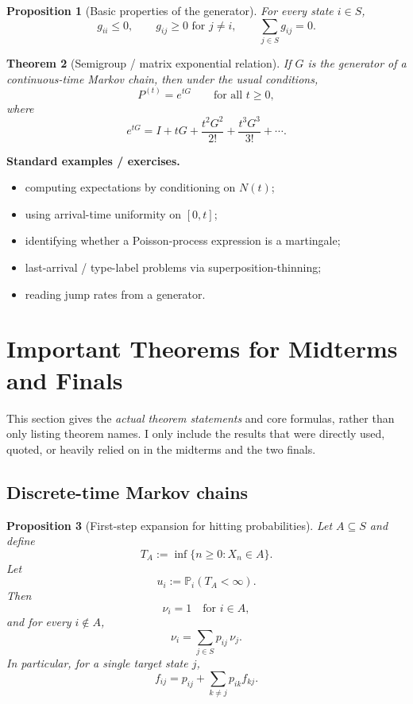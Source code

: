 \documentclass[11pt]{article}
\newtheorem{theorem}{Theorem}[section]
\newtheorem{proposition}[theorem]{Proposition}
\theoremstyle{definition}
\begin{document}
\begin{proposition}[Basic properties of the generator]
For every state $i\in S$,
\[
g_{ii}\le 0,
\qquad
g_{ij}\ge 0 \text{ for } j\neq i,
\qquad
\sum_{j\in S} g_{ij}=0.
\]
\end{proposition}

\begin{theorem}[Semigroup / matrix exponential relation]
If $G$ is the generator of a continuous-time Markov chain, then under the usual conditions,
\[
P^{(t)} = e^{tG}
\qquad \text{for all } t\ge 0,
\]
where
\[
e^{tG}=I+tG+\frac{t^2G^2}{2!}+\frac{t^3G^3}{3!}+\cdots.
\]
\end{theorem}

\textbf{Standard examples / exercises.}
\begin{itemize}[leftmargin=2em]
    \item computing expectations by conditioning on $N(t)$;
    \item using arrival-time uniformity on $[0,t]$;
    \item identifying whether a Poisson-process expression is a martingale;
    \item last-arrival / type-label problems via superposition-thinning;
    \item reading jump rates from a generator.
\end{itemize}

\clearpage

\section{Important Theorems for Midterms and Finals}

\begin{summarybox}
This section gives the \emph{actual theorem statements} and core formulas, rather than only listing theorem names. I only include the results that were directly used, quoted, or heavily relied on in the midterms and the two finals.
\end{summarybox}

\subsection{Discrete-time Markov chains}

\begin{proposition}[First-step expansion for hitting probabilities]
Let $A\subseteq S$ and define
\[
T_A:=\inf\{n\ge 0:X_n\in A\}.
\]
Let
\[
u_i:=\mathbb P_i(T_A<\infty).
\]
Then
\[
\nu_i=1 \quad \text{for } i\in A,
\]
and for every $i\notin A$,
\[
\nu_i = \sum_{j\in S} p_{ij}\,\nu_j.
\]
In particular, for a single target state $j$,
\[
f_{ij}=p_{ij}+\sum_{k\neq j} p_{ik}f_{kj}.
\]
\end{proposition}
\end{document}
